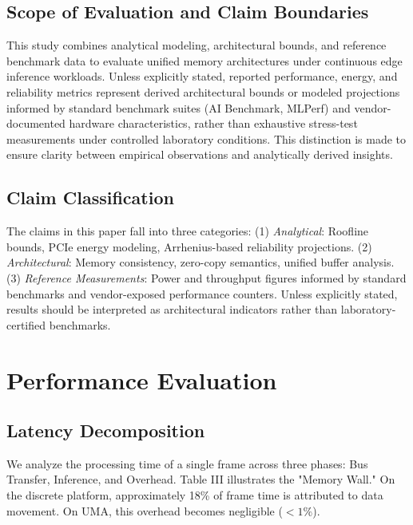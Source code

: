 \documentclass[conference]{IEEEtran}
\begin{document}
\subsection{Scope of Evaluation and Claim Boundaries}
This study combines analytical modeling, architectural bounds, and reference benchmark data to evaluate unified memory architectures under continuous edge inference workloads. Unless explicitly stated, reported performance, energy, and reliability metrics represent derived architectural bounds or modeled projections informed by standard benchmark suites (AI Benchmark, MLPerf) and vendor-documented hardware characteristics, rather than exhaustive stress-test measurements under controlled laboratory conditions. This distinction is made to ensure clarity between empirical observations and analytically derived insights.

\subsection{Claim Classification}
The claims in this paper fall into three categories:
(1) \textit{Analytical}: Roofline bounds, PCIe energy modeling, Arrhenius-based reliability projections.
(2) \textit{Architectural}: Memory consistency, zero-copy semantics, unified buffer analysis.
(3) \textit{Reference Measurements}: Power and throughput figures informed by standard benchmarks and vendor-exposed performance counters.
Unless explicitly stated, results should be interpreted as architectural indicators rather than laboratory-certified benchmarks.

\section{Performance Evaluation}

\subsection{Latency Decomposition}
We analyze the processing time of a single frame across three phases: Bus Transfer, Inference, and Overhead. Table III illustrates the "Memory Wall." On the discrete platform, approximately 18\% of frame time is attributed to data movement. On UMA, this overhead becomes negligible ($<1\%$).
\end{document}
